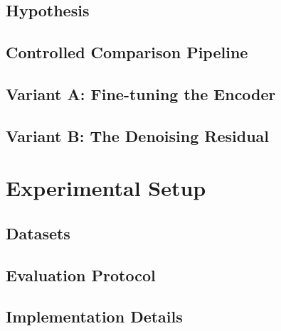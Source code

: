 \documentclass[10pt,twocolumn]{article}
\begin{document}
\subsection{Hypothesis}

\subsection{Controlled Comparison Pipeline}

\subsection{Variant A: Fine-tuning the Encoder}

\subsection{Variant B: The Denoising Residual}

\section{Experimental Setup}

\subsection{Datasets}

\subsection{Evaluation Protocol}

\subsection{Implementation Details}

\end{document}

